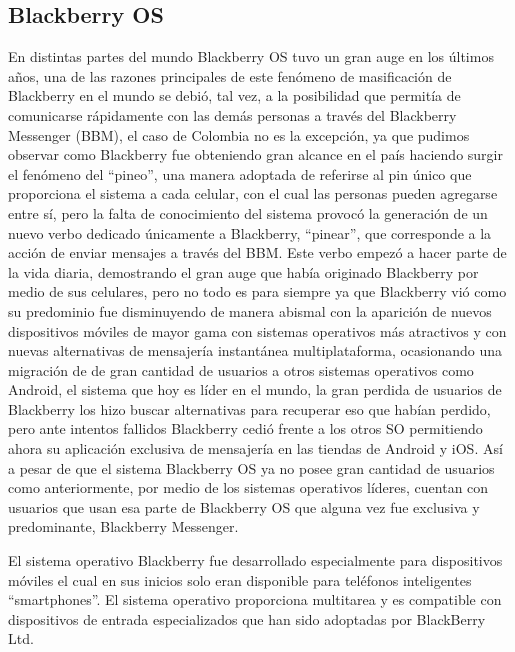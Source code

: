\subsection*{Blackberry OS}
En distintas partes del mundo Blackberry OS tuvo un gran auge en los últimos años, una de las razones principales de este fenómeno de masificación de Blackberry en el mundo se 
debió, tal vez, a la posibilidad que permitía de comunicarse rápidamente con las demás personas a través del Blackberry Messenger (BBM), el caso de Colombia no es la excepción, 
ya que pudimos observar como Blackberry fue obteniendo gran alcance en el país haciendo surgir el fenómeno del “pineo”, una manera adoptada de referirse al pin único que 
proporciona el sistema a cada celular, con el cual las personas pueden agregarse entre sí, pero la falta de conocimiento del sistema provocó la generación de un nuevo verbo 
dedicado únicamente a Blackberry, “pinear”, que corresponde a  la acción de enviar mensajes a través del BBM. Este verbo empezó a hacer parte de la vida diaria, demostrando el 
gran auge que había originado Blackberry por medio de sus celulares, pero no todo es para siempre ya que Blackberry vió como su predominio fue disminuyendo de manera abismal con 
la aparición de nuevos dispositivos móviles de mayor gama con sistemas operativos más atractivos y con nuevas alternativas de mensajería instantánea multiplataforma, ocasionando 
una migración de de gran cantidad de usuarios a otros sistemas operativos como Android, el sistema que hoy es líder en el mundo, la gran perdida de usuarios de Blackberry los 
hizo buscar alternativas para recuperar eso que habían perdido, pero ante intentos fallidos Blackberry cedió frente a los otros SO permitiendo ahora su aplicación exclusiva de 
mensajería en las tiendas de Android y iOS. Así a pesar de que el sistema Blackberry OS ya no posee gran cantidad de usuarios como anteriormente, por medio de los sistemas 
operativos líderes, cuentan con usuarios que usan esa parte de Blackberry OS que alguna vez fue exclusiva y predominante, Blackberry Messenger.

El sistema operativo Blackberry fue desarrollado especialmente para dispositivos  móviles el cual en sus inicios solo eran disponible para teléfonos inteligentes “smartphones”. 
El sistema operativo proporciona multitarea y es compatible con dispositivos de entrada especializados que han sido adoptadas por BlackBerry Ltd.

